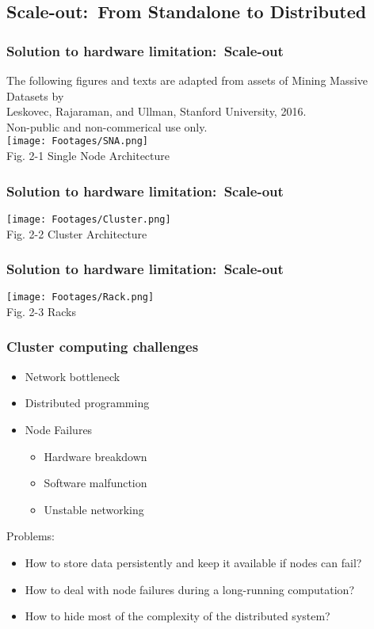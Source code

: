 \documentclass{beamer}
\begin{document}
\subsection{Scale-out:\ From Standalone to Distributed}
\begin{frame}
\frametitle{Solution to hardware limitation:\ Scale-out}
\begin{center}
  \tiny \color{gray} The following figures and texts are adapted from assets of Mining Massive Datasets by\\
  Leskovec, Rajaraman, and Ullman, Stanford University, 2016.\\
   Non-public and non-commerical use only.\\
  \texttt{[image: Footages/SNA.png]} \\
  \scriptsize \color{black} Fig. 2-1 Single Node Architecture
\end{center}
\end{frame}
\begin{frame}
\frametitle{Solution to hardware limitation:\ Scale-out}
\begin{center}
  \texttt{[image: Footages/Cluster.png]} \\
  \scriptsize Fig. 2-2 Cluster Architecture
\end{center}
\end{frame}
\begin{frame}
\frametitle{Solution to hardware limitation:\ Scale-out}
\begin{center}
  \texttt{[image: Footages/Rack.png]} \\
  \scriptsize Fig. 2-3 Racks
\end{center}
\end{frame}
\begin{frame} \small
\frametitle{Cluster computing challenges}
\begin{itemize}
  \item Network bottleneck
  \item Distributed programming
  \item Node Failures
  \begin{itemize}
    \item Hardware breakdown
    \item Software malfunction
    \item Unstable networking
  \end{itemize}
\end{itemize}
Problems:
\begin{itemize}
\item How to store data persistently and keep it available if nodes can fail?
\item How to deal with node failures during a long-running computation?
\item How to hide most of the complexity of the distributed system?
\end{itemize}
\end{frame}
\end{document}
